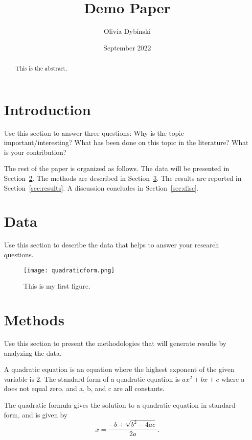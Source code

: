 \documentclass[12pt]{article}
\title{Demo Paper}
\author{Olivia Dybinski\\}
\date{September 2022}
\begin{document}
 \maketitle

 \begin{abstract}
This is the abstract. 
 \end{abstract}


 \section{Introduction} 
 \label{sec:intro}

 Use this section to answer three questions:
 Why is the topic important/interesting?
 What has been done on this topic in the literature?
 What is your contribution?


 The rest of the paper is organized as follows.
 The data will be presented in Section~\ref{sec:data}.
 The methods are described in Section~\ref{sec:meth}.
 The results are reported in Section~\ref{sec:results}.
 A discussion concludes in Section~\ref{sec:disc}.


 \section{Data}
 \label{sec:data}

 Use this section to describe the data that helps to answer your research questions.

 \begin{figure}[!htb]
    \centering
    \texttt{[image: quadraticform.png]}
    \caption{This is my first figure.}
    \label{fig:Quadratic Formula}
  \end{figure}

 \section{Methods}
 \label{sec:meth}

 Use this section to present the methodologies that will generate results by analyzing the data.

 A quadratic equation is an equation where the highest exponent of the given variable is 2. The standard form of a quadratic equation is $ax^2 + bx +c$ where a does not equal zero, and a, b, and c are all constants.

 The quadratic formula gives the solution to a quadratic equation in standard form, and is given by $$x=\frac{-b\pm\sqrt{b^2-4ac}}{2a}.$$
\end{document}
